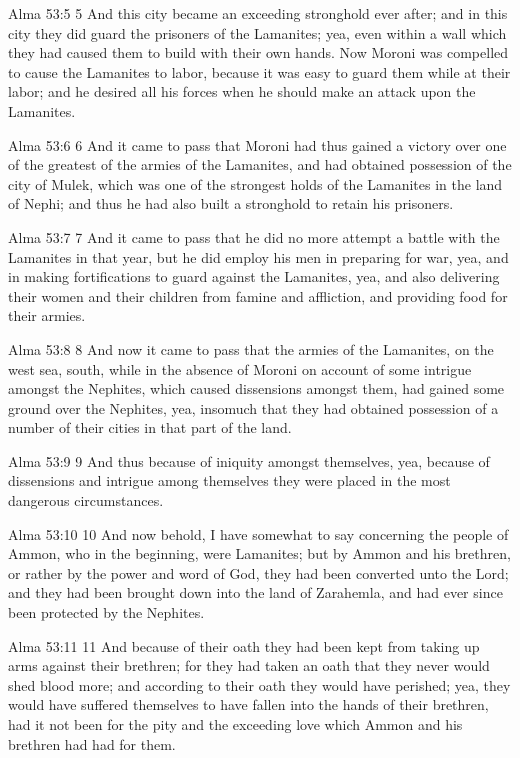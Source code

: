 Alma 53:5
 5 And this city became an exceeding stronghold ever after; and
in this city they did guard the prisoners of the Lamanites; yea,
even within a wall which they had caused them to build with their
own hands. Now Moroni was compelled to cause the Lamanites to
labor, because it was easy to guard them while at their labor;
and he desired all his forces when he should make an attack upon
the Lamanites.

Alma 53:6
 6 And it came to pass that Moroni had thus gained a victory over
one of the greatest of the armies of the Lamanites, and had
obtained possession of the city of Mulek, which was one of the
strongest holds of the Lamanites in the land of Nephi; and thus
he had also built a stronghold to retain his prisoners.

Alma 53:7
 7 And it came to pass that he did no more attempt a battle with
the Lamanites in that year, but he did employ his men in
preparing for war, yea, and in making fortifications to guard
against the Lamanites, yea, and also delivering their women and
their children from famine and affliction, and providing food for
their armies.

Alma 53:8
 8 And now it came to pass that the armies of the Lamanites, on
the west sea, south, while in the absence of Moroni on account of
some intrigue amongst the Nephites, which caused dissensions
amongst them, had gained some ground over the Nephites, yea,
insomuch that they had obtained possession of a number of their
cities in that part of the land.

Alma 53:9
 9 And thus because of iniquity amongst themselves, yea, because
of dissensions and intrigue among themselves they were placed in
the most dangerous circumstances.

Alma 53:10
 10 And now behold, I have somewhat to say concerning the people
of Ammon, who in the beginning, were Lamanites; but by Ammon and
his brethren, or rather by the power and word of God, they had
been converted unto the Lord; and they had been brought down into
the land of Zarahemla, and had ever since been protected by the
Nephites.

Alma 53:11
 11 And because of their oath they had been kept from taking up
arms against their brethren; for they had taken an oath that they
never would shed blood more; and according to their oath they
would have perished; yea, they would have suffered themselves to
have fallen into the hands of their brethren, had it not been for
the pity and the exceeding love which Ammon and his brethren had
had for them.


